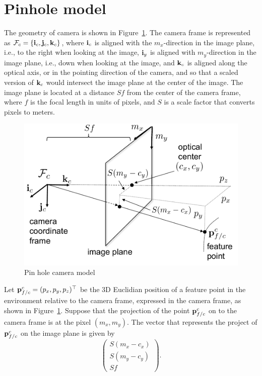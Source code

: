 \section{Pinhole model}
\label{sec:pin_hole_model}

The geometry of camera is shown in Figure~\ref{fig:pin_hole_camera}.
The camera frame is represented as $\mathcal{F}_c = \{\mathbf{i}_c, \mathbf{j}_c, \mathbf{k}_c\}$, where $\mathbf{i}_c$ is aligned with the $m_x$-direction in the image plane, i.e., to the right when looking at the image, $\mathbf{i}_y$ is aligned with $m_y$-direction in the image plane, i.e., down when looking at the image, and $\mathbf{k}_c$ is aligned along the optical axis, or in the pointing direction of the camera, and so that a scaled version of $\mathbf{k}_c$ would intersect the image plane at the center of the image.  The image plane is located at a distance $Sf$ from the center of the camera frame, where $f$ is the focal length in units of pixels, and $S$ is a scale factor that converts pixels to meters.  
\begin{figure}
  \centering
  \includegraphics[width=\linewidth]{chap6_camera_features/figures/pin_hole_camera}
  \caption{Pin hole camera model}
  \label{fig:pin_hole_camera}
\end{figure}

Let $\mathbf{p}_{f/c}^c = (p_x, p_y, p_z)^\top$ be the 3D Euclidian position of a feature point in the environment relative to the camera frame, expressed in the camera frame, as shown in Figure~\ref{fig:pin_hole_camera}.  Suppose that the projection of the point $\mathbf{p}_{f/c}^c$ on to the camera frame is at  the pixel $(m_x, m_y)$.  The vector that represents the project of $\mathbf{p}_{f/c}^c$ on the image plane is given by
\[
\begin{pmatrix} S(m_x-c_x) \\ S(m_y-c_y) \\ Sf \end{pmatrix}.
\]

